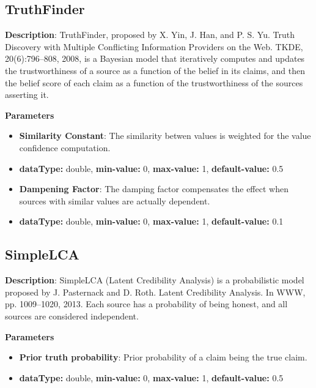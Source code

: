 \documentclass[a4paper,10pt]{scrartcl}
\begin{document}
\subsection{TruthFinder}
\begin{description}
\item \textbf{Description}: TruthFinder, proposed by X. Yin, J. Han, and P. S. Yu. Truth Discovery with Multiple Conflicting Information Providers on the Web. TKDE, 20(6):796–808, 2008, is a Bayesian model that iteratively computes and updates the trustworthiness of a source as a function of the belief in its claims, and then the belief score of each claim as a function of the trustworthiness of the sources asserting it.
\item \textbf{Parameters}
\begin{itemize}
\item \textbf{Similarity Constant}: The similarity betwen values is weighted for the value confidence computation.
\item[]\textbf{dataType: }double, \textbf{min-value: }0, \textbf{max-value: }1, \textbf{default-value: }0.5\item \textbf{Dampening Factor}: The damping factor compensates the effect when sources with similar values are actually dependent.
\item[]\textbf{dataType: }double, \textbf{min-value: }0, \textbf{max-value: }1, \textbf{default-value: }0.1\end{itemize}
\end{description}
\subsection{SimpleLCA}
\begin{description}
\item \textbf{Description}: SimpleLCA (Latent Credibility Analysis) is a probabilistic model proposed by J. Pasternack and D. Roth. Latent Credibility Analysis. In WWW, pp. 1009–1020, 2013. Each source has a probability of being honest, and all sources are considered independent.
\item \textbf{Parameters}
\begin{itemize}
\item \textbf{Prior truth probability}: Prior probability of a claim being the true claim.
\item[]\textbf{dataType: }double, \textbf{min-value: }0, \textbf{max-value: }1, \textbf{default-value: }0.5\end{itemize}
\end{description}
\end{document}
